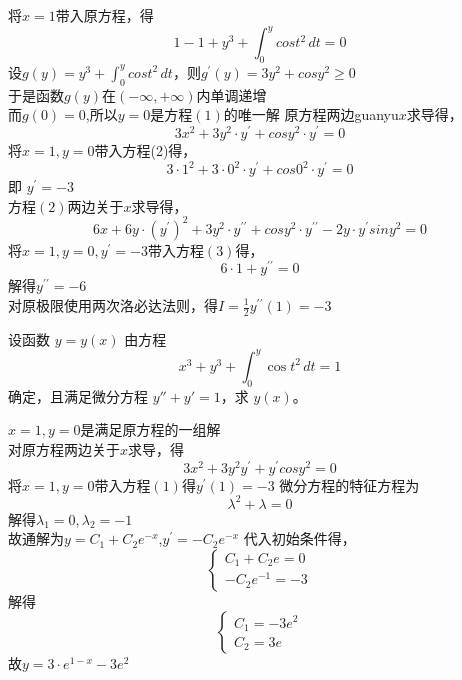 \begin{solution}
    将\(x=1\)带入原方程，得
    \[\]
    \begin{equation}
        1-1+y^3+\int_{0}^{y} cost^2\,dt = 0
    \end{equation}
    设\(g(y) = y^3+\int_{0}^{y} cost^2\,dt \)，则\(g^{\prime}(y)= 3y^2 +cosy^2 \geq 0\)\\
    于是函数\(g(y)\)在\((-\infty,+\infty)\)内单调递增\\
    而\(g(0) = 0\),所以\(y=0\)是方程\((1)\)的唯一解
    原方程两边guanyu\(x\)求导得，
    \begin{equation}
        3x^2 +3y^2\cdot y^\prime +cosy^2 \cdot y^\prime= 0
    \end{equation}
    将\(x=1,y=0\)带入方程(2)得，
    \[3 \cdot 1^2 +3 \cdot 0^2 \cdot y^\prime +cos0^2 \cdot y^\prime =0\]
    即 \(y^\prime =-3\)\\
    方程\((2)\)两边关于\(x\)求导得，
    \begin{equation}
        6x+6y\cdot(y^\prime)^2+3y^2\cdot y^{\prime\prime}+cosy^2 \cdot y^{\prime\prime} -2y \cdot y^\prime siny^2=0
    \end{equation}
    将\(x=1,y=0,y^\prime =-3\)带入方程\((3)\)得，
    \[6\cdot1 + y^{\prime\prime}=0\]
    解得\(y^{\prime\prime} = -6\)\\
    对原极限使用两次洛必达法则，得\(I = \frac{1}{2}y^{\prime\prime}(1) = -3\)
\end{solution}
\begin{question}
    设函数 $ y = y(x) $ 由方程
$$
x^3 + y^3 + \int_{0}^{y} \cos t^2 \, dt = 1
$$
    确定，且满足微分方程 $ y'' + y' = 1 $，求 $ y(x) $。
\end{question}
\begin{solution}
    \(x=1,y=0\)是满足原方程的一组解\\
    对原方程两边关于\(x\)求导，得
    \begin{equation}
        3x^2+3y^2y^{\prime}+y^\prime cosy^2 =0
    \end{equation}
    将\(x=1,y=0\)带入方程\((1)\)得\(y^\prime(1) =-3 \)
    微分方程的特征方程为\[\lambda^2+\lambda =0\]
    解得\(\lambda_1=0,\lambda_2=-1\)\\
    故通解为\(y=C_1+C_2e^{-x}\),\(y^\prime = -C_2e^{-x}\)
    代入初始条件得，
    \[\begin{cases}
        C_1+C_2e=0\\
        -C_2e^{-1}=-3
    \end{cases}\]
    解得\[\begin{cases}
        C_1 = -3e^2\\
        C_2=3e
    \end{cases}\]
    故\(y=3\cdot e^{1-x} - 3 e^2\)
\end{solution}
